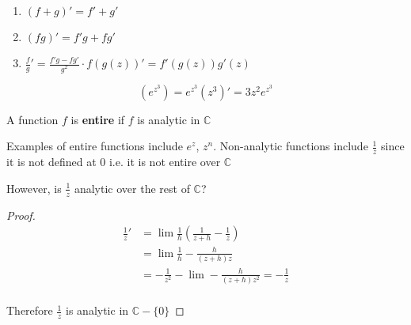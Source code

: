 \documentclass[../notes.tex]{subfiles}
\begin{document}
\begin{enumerate}
	\item $ (f+g)' = f' + g'$ 
	\item $ (fg)' = f'g + fg' $ 
	\item $ \frac{f}{g}' = \frac{f'g - fg'}{g^2} \cdot f(g(z))' = f'(g(z))g'(z) $ 
\end{enumerate}


\begin{example}
	\begin{equation}
		(e^{z^3}) = e^{z^3} (z^3)' = 3z^2e^{z^{3}}
	\end{equation}
	
\end{example}

\begin{definition}
	A function $ f $ is \textbf{entire} if $ f $ is analytic in $ \mathbb{C} $ 
\end{definition}

Examples of entire functions include $ e^z $, $ z^n $. Non-analytic functions include $ \frac{1}{z} $ since it is not defined at $ 0 $ i.e. it is not entire over $ \mathbb{C} $ 


However, is $ \frac{1}{z} $ analytic over the rest of $ \mathbb{C} $?

\begin{proof}
	\begin{equation}
		\begin{split}
			\frac{1}{z}' &= \lim \frac{1}{h}(\frac{1}{z+h} - \frac{1}{z})  \\
			 &= \lim \frac{1}{h} -\frac{h}{(z+h)z} \\
			 &= -\frac{1}{z^2} - \lim -\frac{h}{(z+h)z^2} = -\frac{1}{z} \\
		\end{split}
	\end{equation}

	Therefore $ \frac{1}{z}$  is analytic in $ \mathbb{C} - \{0\} $ 
	
\end{proof}
\end{document}
